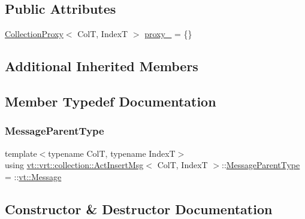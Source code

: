 \subsection*{Public Attributes}
\begin{DoxyCompactItemize}
\item 
\hyperlink{structvt_1_1vrt_1_1collection_1_1_collection_proxy}{Collection\+Proxy}$<$ ColT, IndexT $>$ \hyperlink{structvt_1_1vrt_1_1collection_1_1_act_insert_msg_a2be9c49b1ec5c2706be27f75d8b3a168}{proxy\+\_\+} = \{\}
\end{DoxyCompactItemize}
\subsection*{Additional Inherited Members}


\subsection{Member Typedef Documentation}
\mbox{\label{structvt_1_1vrt_1_1collection_1_1_act_insert_msg_a85df5f61a78f6a48ed7488d6e497f1f3}} 
\subsubsection{\texorpdfstring{Message\+Parent\+Type}{MessageParentType}}
{\footnotesize\ttfamily template$<$typename ColT, typename IndexT$>$ \\
using \hyperlink{structvt_1_1vrt_1_1collection_1_1_act_insert_msg}{vt\+::vrt\+::collection\+::\+Act\+Insert\+Msg}$<$ ColT, IndexT $>$\+::\hyperlink{structvt_1_1messaging_1_1_active_msg_ac2e6d93267991027ce78c968b17064c7}{Message\+Parent\+Type} =  \+::\hyperlink{namespacevt_a3a3ddfef40b4c90915fa43cdd5f129ea}{vt\+::\+Message}}



\subsection{Constructor \& Destructor Documentation}
\mbox{\label{structvt_1_1vrt_1_1collection_1_1_act_insert_msg_acd0c4f8868194e27580d9bf5d748bb14}} 
